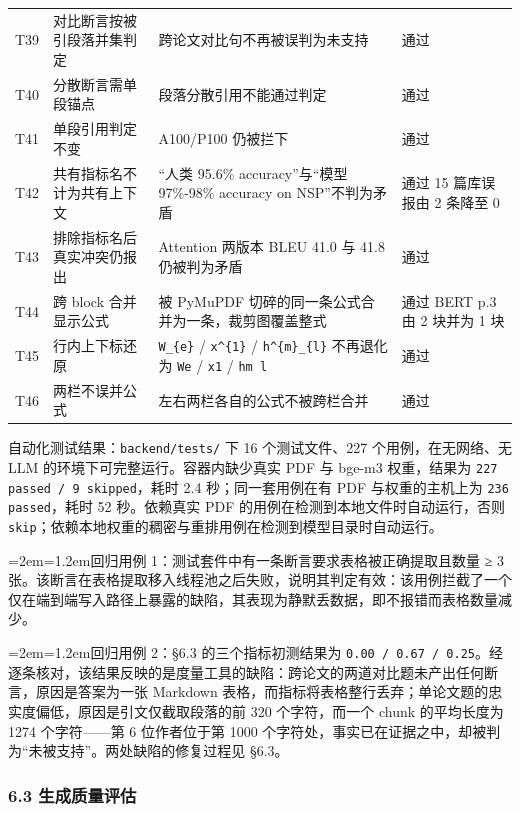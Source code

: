\documentclass[UTF8,fontset=windows,zihao=5,a4paper]{ctexart}
\newenvironment{aside}{\par\vspace{3pt}\begingroup\zihao{5}%
  \leftskip=2em\rightskip=1.2em\noindent\ignorespaces}{\par\endgroup\vspace{3pt}}
\begin{document}
\begin{longtable}{@{}p{}p{}p{}p{}@{}}
T39 & 对比断言按被引段落并集判定 & 跨论文对比句不再被误判为未支持 & 通过 \\
T40 & 分散断言需单段锚点 & 段落分散引用不能通过判定 & 通过 \\
T41 & 单段引用判定不变 & A100/P100 仍被拦下 & 通过 \\
T42 & 共有指标名不计为共有上下文 & “人类 95.6\% accuracy”与“模型 97\%-98\% accuracy on NSP”不判为矛盾 & 通过 15 篇库误报由 2 条降至 0 \\
T43 & 排除指标名后真实冲突仍报出 & Attention 两版本 BLEU 41.0 与 41.8 仍被判为矛盾 & 通过 \\
T44 & 跨 block 合并显示公式 & 被 PyMuPDF 切碎的同一条公式合并为一条，裁剪图覆盖整式 & 通过 BERT p.3 由 2 块并为 1 块 \\
T45 & 行内上下标还原 & \texttt{W\_\allowbreak{}\{e\}} / \texttt{x\textasciicircum{}\{1\}} / \texttt{h\textasciicircum{}\{m\}\_\allowbreak{}\{l\}} 不再退化为 \texttt{We} / \texttt{x1} / \texttt{hm l} & 通过 \\
T46 & 两栏不误并公式 & 左右两栏各自的公式不被跨栏合并 & 通过 \\
\end{longtable}

自动化测试结果：\texttt{backend/tests/} 下 16 个测试文件、227 个用例，在无网络、无 LLM 的环境下可完整运行。容器内缺少真实 PDF 与 bge-m3 权重，结果为 \texttt{227 passed / 9 skipped}，耗时 2.4 秒；同一套用例在有 PDF 与权重的主机上为 \texttt{236 passed}，耗时 52 秒。依赖真实 PDF 的用例在检测到本地文件时自动运行，否则 \texttt{skip}；依赖本地权重的稠密与重排用例在检测到模型目录时自动运行。

\begin{aside}回归用例 1：测试套件中有一条断言要求表格被正确提取且数量 ≥ 3 张。该断言在表格提取移入线程池之后失败，说明其判定有效：该用例拦截了一个仅在端到端写入路径上暴露的缺陷，其表现为静默丢数据，即不报错而表格数量减少。\end{aside}

\begin{aside}回归用例 2：§6.3 的三个指标初测结果为 \texttt{0.00 / 0.67 / 0.25}。经逐条核对，该结果反映的是度量工具的缺陷：跨论文的两道对比题未产出任何断言，原因是答案为一张 Markdown 表格，而指标将表格整行丢弃；单论文题的忠实度偏低，原因是引文仅截取段落的前 320 个字符，而一个 chunk 的平均长度为 1274 个字符——第 6 位作者位于第 1000 个字符处，事实已在证据之中，却被判为“未被支持”。两处缺陷的修复过程见 §6.3。\end{aside}

\subsubsection*{6.3 生成质量评估}
\end{document}
